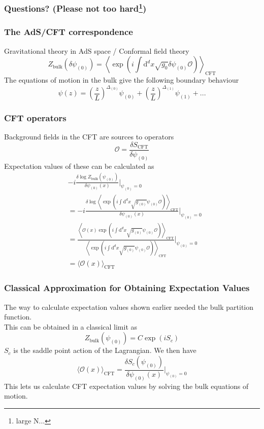 \documentclass{beamer}
\renewcommand{\d}{\ensuremath{\mathrm{d}}}
\renewcommand{\i}{\ensuremath{i}}
\begin{document}
\begin{frame}
\frametitle{Questions? (Please not too hard\footnote{large N...})}
\end{frame}

\begin{frame}
\frametitle{The AdS/CFT correspondence}
Gravitational theory in AdS space / Conformal field theory
\begin{equation}
 Z_{\mathrm{bulk}}(\delta\psi_{(0)})=\left\langle\exp(\i\int\d^dx\sqrt{g_0}\delta\psi_{(0)}\mathcal{O})\right\rangle_{\mathrm{CFT}}\label{fulCorr}
\end{equation}
The equations of motion in the bulk give the following boundary behaviour
\begin{equation}
 \psi(z)=\left(\frac{z}{L}\right)^{\Delta_{(0)}}\psi_{(0)}+
\left(\frac{z}{L}\right)^{\Delta_{(1)}}\psi_{(1)}+...
\end{equation}
\end{frame}

\begin{frame}
\frametitle{CFT operators}
Background fields in the CFT are sources to operators
\begin{equation}
\mathcal{O}= \frac{\delta S_{\mathrm{CFT}}}{\delta \psi_{(0)}}
\end{equation}
Expectation values of these can be calculated as
\begin{equation}
\begin{split}
&-\i\frac{\delta\log Z_{\mathrm{bulk}}(\psi_{(0)})}{\delta\psi_{(0)}(x)}|_{\psi_{(0)}=0}\\
&=-\i\frac{\delta\log\left\langle\exp(\i\int\d^dx\sqrt{g_{(0)}}\psi_{(0)}\mathcal{O})\right\rangle_{\mathrm{CFT}}}{\delta\psi_{(0)}(x)}|_{\psi_{(0)}=0}\\
&=\frac{\left\langle\mathcal{O}(x)\exp(\i\int\d^dx\sqrt{g_{(0)}}\psi_{(0)}\mathcal{O})\right\rangle_{\mathrm{CFT}}}{\left\langle\exp(\i\int\d^dx\sqrt{g_{(0)}}\psi_{(0)}\mathcal{O})\right\rangle_{\mathrm{CFT}}}|_{\psi_{(0)}=0}\\
&=\langle \mathcal{O}(x) \rangle_{\mathrm{CFT}}
\end{split}
\end{equation}
\end{frame}




\begin{frame}
\frametitle{Classical Approximation for Obtaining Expectation Values}
The way to calculate expectation values shown earlier needed the bulk partition function.\\
This can be obtained in a classical limit as
\begin{equation}
 Z_{\mathrm{bulk}}(\psi_{(0)})=C\exp(\i S_c)\label{semi}
\end{equation}
$S_c$ is the saddle point action of the Lagrangian. We then have 
\begin{equation}
\langle \mathcal{O}(x) \rangle_{\mathrm{CFT}}=\frac{\delta S_c(\psi_{(0)})}{\delta\psi_{(0)}(x)}|_{\psi_{(0)}=0}
\end{equation}
This lets us calculate CFT expectation values by solving the bulk equations of motion.
\end{frame}
\end{document}
